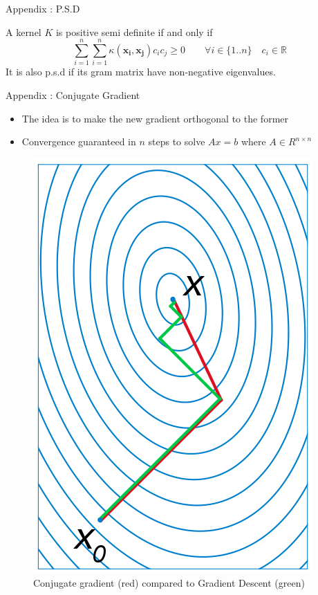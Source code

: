\documentclass[compress]{beamer}
\let\vec\mathbf
\newcommand*{\R}{%
  \mathbb{R}%
}
\begin{document}
\begin{frame}[noframenumbering]{Appendix : P.S.D}
	\begin{definition}
		A kernel $K$ is positive semi definite if and only if\\
		\begin{equation}
		\sum\limits_{i=1}^{n}\sum\limits_{i=1}^{n}\kappa(\vec{x_{i}},\vec{x_{j}})c_{i}c_{j} \geq 0 \qquad \forall i \in \{1..n\} \quad c_i \in \R
		\end{equation}
		It is also p.s.d if its gram matrix have non-negative eigenvalues.
	\end{definition}
\end{frame}
\begin{frame}[noframenumbering]{Appendix : Conjugate Gradient}
\begin{multicols}{2}
	\begin{itemize}
		\item The idea is to make the new gradient orthogonal to the former
		\item Convergence guaranteed in $n$ steps to solve $Ax=b$ where $A \in R^{n \times n}$
	\end{itemize}
	\begin{figure}[!htb]
		\centering
		\includegraphics[height=0.5\textheight]{data/sota/conj_grad.png}
		\caption*{Conjugate gradient (red) compared to Gradient Descent (green)}
		\label{fig:conj_grad}
	\end{figure} 
\end{multicols}
\end{frame}
\end{document}
